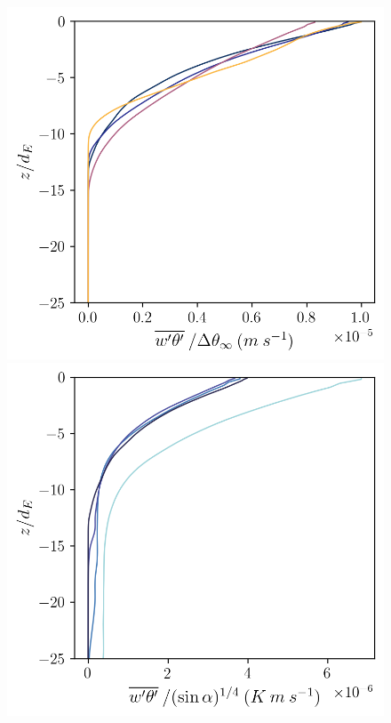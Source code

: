 \documentclass[draft]{agujournal2019}
\begin{document}
\begin{figure}[h!]
\begin{minipage}{0.5\textwidth}
    \end{minipage}
    \begin{minipage}{0.5\textwidth}
        \includegraphics[trim={0 0 0 0},clip,width=\textwidth]{Figures/heatflux_cmp_dT_43h_tav13h_dTscale_z_profile.png}
    \end{minipage}%
    \begin{minipage}{0.5\textwidth}
        \includegraphics[trim={0 0 0 0},clip,width=\textwidth]{Figures/heatflux_cmp_dslope_43h_tav13h_slopescale_z_profile.png}

\end{minipage}
\end{figure}
\end{document}
